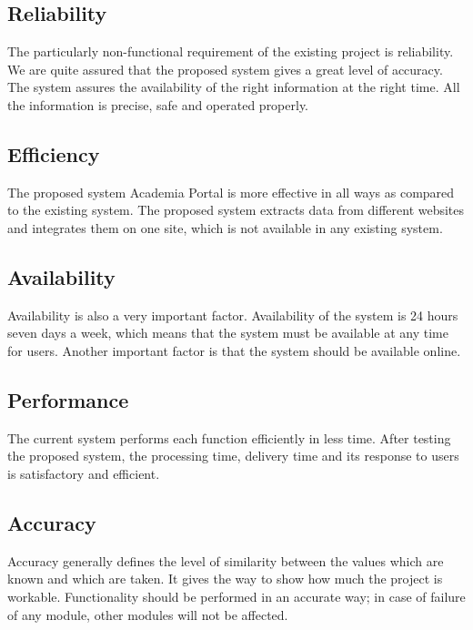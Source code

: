\subsection{Reliability}

The particularly non-functional requirement of the existing project is reliability. We are quite assured that the proposed system gives a great level of accuracy. The system assures the availability of the right information at the right time. All the information is precise, safe and operated properly.

\subsection{Efficiency}

The proposed system Academia Portal is more effective in all ways as compared to the existing system. The proposed system extracts data from different websites and integrates them on one site, which is not available in any existing system.

\subsection{Availability}

Availability is also a very important factor. Availability of the system is 24 hours seven days a week, which means that the system must be available at any time for users. Another important factor is that the system should be available online.

\subsection{Performance}

The current system performs each function efficiently in less time. After testing the proposed system, the processing time, delivery time and its response to users is satisfactory and efficient.

\subsection{Accuracy}

Accuracy generally defines the level of similarity between the values which are known and which are taken. It gives the way to show how much the project is workable. Functionality should be performed in an accurate way; in case of failure of any module, other modules will not be affected.

